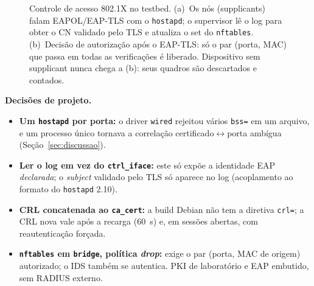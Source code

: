 \documentclass[12pt]{article}
\renewcommand{\paragraph}[1]{\par\noindent\textbf{#1}\ }
\begin{document}
\begin{figure}[!htb]
{}
\caption{Controle de acesso 802.1X no testbed. (a)~Os n\'os (supplicants) falam EAPOL/EAP-TLS com o \texttt{hostapd}; o supervisor l\^e o log para obter o CN validado pelo TLS e atualiza o set do \texttt{nftables}. (b)~Decis\~ao de autoriza\c{c}\~ao ap\'os o EAP-TLS: s\'o o par (porta, MAC) que passa em todas as verifica\c{c}\~oes \'e liberado. Dispositivo sem supplicant nunca chega a (b): seus quadros s\~ao descartados e contados.}\label{fig:arq8021x}
\end{figure}

\paragraph{Decis\~oes de projeto.}
\begin{itemize}
  \item \textbf{Um \texttt{hostapd} por porta:} o driver \texttt{wired} rejeitou v\'arios \texttt{bss=} em um arquivo, e um processo \'unico tornava a correla\c{c}\~ao certificado$\leftrightarrow$porta amb\'igua (Se\c{c}\~ao~\ref{sec:discussao}).
  \item \textbf{Ler o log em vez do \texttt{ctrl\_iface}:} este s\'o exp\~oe a identidade EAP \emph{declarada}; o \emph{subject} validado pelo TLS s\'o aparece no log (acoplamento ao formato do \texttt{hostapd} 2.10).
  \item \textbf{CRL concatenada ao \texttt{ca\_cert}:} a build Debian n\~ao tem a diretiva \texttt{crl=}; a CRL nova vale ap\'os a recarga (60~s) e, em sess\~oes abertas, com reautentica\c{c}\~ao for\c{c}ada.
  \item \textbf{\texttt{nftables} em \texttt{bridge}, pol\'itica \emph{drop}:} exige o par (porta, MAC de origem) autorizado; o IDS tamb\'em se autentica. PKI de laborat\'orio e EAP embutido, sem RADIUS externo.
\end{itemize}
\end{document}
